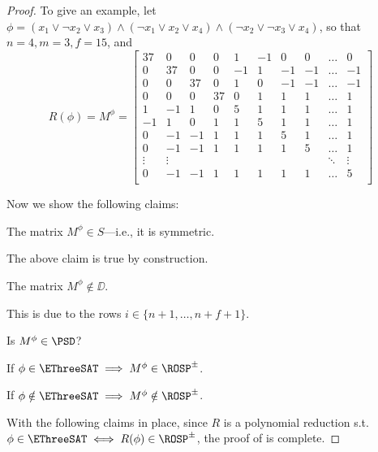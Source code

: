 \begin{proof}
	 To give an example, let $\phi = (x_1 \lor \neg x_2\lor x_3) \land  (\neg x_1 \lor x_2\lor x_4) \land  (\neg x_2 \lor \neg x_3 \lor x_4)$, so that $n=4, m=3, f=15$, and
	 \begin{equation}
	 	R(\phi) = M^\phi = \begin{bmatrix}
	 		37 & 0 & 0 & 0 & 1 & -1 & 0 & 0 & \dots & 0 \\
	 		0 & 37 & 0 & 0 & -1 & 1 & -1 & -1 & \dots & -1\\
	 		 0 & 0 & 37 & 0 & 1 & 0 & -1 & -1 & \dots  & -1\\
	 		 0 & 0 & 0 & 37 & 0 & 1 & 1 & 1 & \dots & 1\\
 	 		 1 & -1 & 1 & 0 & 5 & 1 & 1 & 1 & \dots & 1\\
 	 		 -1 & 1 & 0 & 1 & 1 & 5 & 1 & 1 & \dots & 1\\
  	 		 0 & -1 & -1 & 1 & 1 & 1 & 5 & 1 & \dots & 1\\
 	 		 0 & -1 & -1 & 1 & 1 & 1 & 1 & 5 & \dots & 1\\
 	 		 \vdots & \vdots & & & & & & & \ddots & \vdots\\
 	 		 0 & -1 & -1 & 1 & 1 & 1 & 1 & 1 & \dots & 5\\
	 	\end{bmatrix}
	 \end{equation}
	 
	 Now we show the following claims:
	 \begin{claim}
	 	The matrix $M^\phi \in S$---i.e., it is symmetric.
	 \end{claim}
	 
	 The above claim is true by construction.
	 
	 \begin{claim}
	 	The matrix $M^\phi \notin \DD$.
	 \end{claim}
	 
	 This is due to the rows $i\in\{n+1, \dots, n+f+1\}$.
		
	\begin{question}	 
	 	Is $M^\phi \in \PSD$? 
	 \end{question}
	 
	 \begin{claim}
	 \label{claim:phi_sat_implies_M_rosp}
	 	If $\phi\in\EThreeSAT \implies M^\phi \in \ROSP^{\pm}$.
	 \end{claim}
	 
	 \begin{claim}
	 	\label{claim:phi_unsat_implies_M_not_rosp}
	 	If $\phi\notin\EThreeSAT \implies M^\phi \notin \ROSP^{\pm}$.
	 \end{claim}
	 
	 With the following claims in place, since $R$ is a polynomial reduction s.t. $\phi\in\EThreeSAT \iff R(\phi)\in\ROSP^{\pm}$, the proof of  is complete.
\end{proof}

